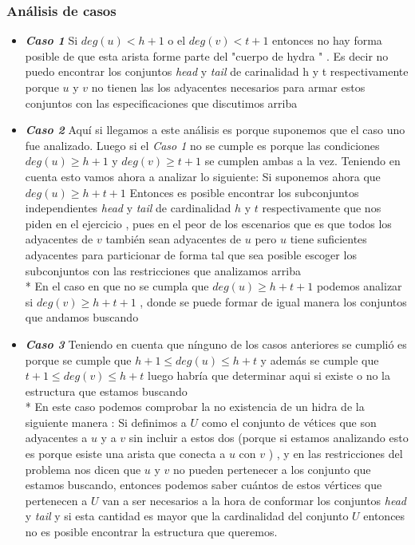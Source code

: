 \documentclass[12pt]{article}
\begin{document}
    \subsubsection{An\'alisis de casos } 

    \begin{itemize}
        \item \textit{\textbf {Caso 1 }} Si $deg (u) <  h +1$   o el $deg(v) < t+1 $ entonces no hay forma posible 
        de que esta arista forme parte del "cuerpo de hydra " . Es decir no puedo encontrar los conjuntos \textit{head} y 
        \textit{tail} de carinalidad h y t respectivamente porque $u$ y $v$ no tienen las los adyacentes necesarios para armar estos 
        conjuntos con las especificaciones que discutimos arriba 

        \item  \textit{\textbf {Caso 2}} Aqu\'i si llegamos a este an\'alisis es porque suponemos que el caso uno fue analizado. 
        Luego si el  \textit{Caso 1} no se cumple es porque las condiciones $deg (u) \geq h+1 $ y  $deg(v) \geq t+1$ se cumplen ambas a la vez.
        Teniendo en cuenta esto vamos ahora a analizar lo siguiente: 
        Si suponemos ahora que $deg (u) \geq h+t+1$  Entonces es posible  encontrar los subconjuntos independientes \textit{head}  y \textit{tail } de cardinalidad $h$ y $t$ respectivamente que
        nos piden en el ejercicio , pues en el peor de los escenarios  que es que todos los adyacentes de $v$ tambi\'en sean adyacentes de $u$ pero $u$ tiene suficientes adyacentes para particionar
        de forma tal que sea posible escoger los subconjuntos con las restricciones que analizamos arriba
        \\*
        En el caso en que no se cumpla que $deg (u) \geq h+t+1$ podemos analizar si $deg(v) \geq h+t+1$ , donde se puede formar de igual manera los conjuntos que andamos buscando 
        
        \item  \textit{\textbf{Caso 3}} Teniendo en cuenta que n\'inguno de los casos anteriores se cumpli\'o es 
        porque se cumple que $h+1 \leq deg(u) \leq h + t  $ y adem\'as se cumple que $t+1 \leq deg(v) \leq h + t  $
        luego habr\'ia que determinar aqui si existe o no la estructura que estamos buscando 
        \\*
        En este caso podemos comprobar la no existencia de un hidra de la siguiente manera :
        Si definimos a $U$ como el conjunto de v\'etices que son adyacentes a $u$ y a $v$ sin incluir a estos dos (porque si estamos analizando
        esto es porque esiste una arista que conecta a $u$ con $v$ ) , y en las restricciones del problema nos dicen 
        que $u$ y $v$ no pueden pertenecer a los conjunto  que estamos buscando, entonces podemos saber cu\'antos de estos v\'ertices
        que pertenecen a $U$ van a ser necesarios a la hora de conformar los conjuntos \textit{head} y \textit{tail} y si esta cantidad 
        es mayor que la cardinalidad del conjunto $U$ entonces no es posible  encontrar la estructura que queremos. 
    \end{itemize}
\end{document}
